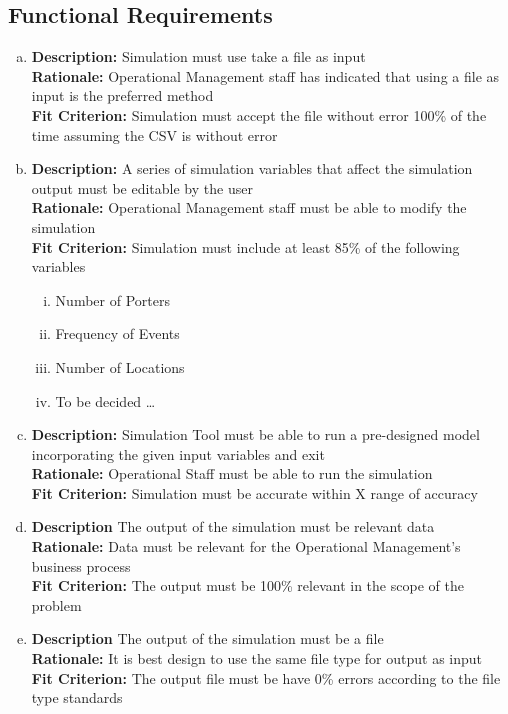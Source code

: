 \documentclass[paper=letter, fontsize=10pt]{scrartcl}
\numberwithin{equation}{section}		%
\numberwithin{figure}{section}			%
\numberwithin{table}{section}				%
\begin{document}
\subsection{Functional Requirements}
\begin{enumerate}[(a)]
	\item \textbf{Description:} Simulation must use take a file as input
	\\ \textbf{Rationale:} Operational Management staff has indicated that using a file as input is the preferred method 
	\\ \textbf{Fit Criterion:} Simulation must accept the file without error 100\% of the time assuming the CSV is without error
	\item \textbf{Description:} A series of simulation variables that affect the simulation output must be editable by the user
	\\ \textbf{Rationale:} Operational Management staff must be able to modify the simulation
	\\ \textbf{Fit Criterion:} Simulation must include at least 85\% of the following variables   
	\begin{enumerate}[(i)]
		\item Number of Porters
		\item Frequency of Events
		\item Number of Locations
		\item To be decided \ldots
	\end{enumerate}
	\item \textbf{Description:} Simulation Tool must be able to run a pre-designed model incorporating the given input variables and exit
	\\ \textbf{Rationale:} Operational Staff must be able to run the simulation
	\\ \textbf{Fit Criterion:} Simulation must be accurate within X range of accuracy
	\item \textbf{Description} The output of the simulation must be relevant data
	\\ \textbf{Rationale:} Data must be relevant for the Operational Management's business process
	\\ \textbf{Fit Criterion:} The output must be 100\% relevant in the scope of the problem
	\item \textbf{Description} The output of the simulation must be a file
	\\ \textbf{Rationale:} It is best design to use the same file type for output as input
	\\ \textbf{Fit Criterion:} The output file must be have 0\% errors according to the file type standards 
\end{enumerate}
\end{document}
